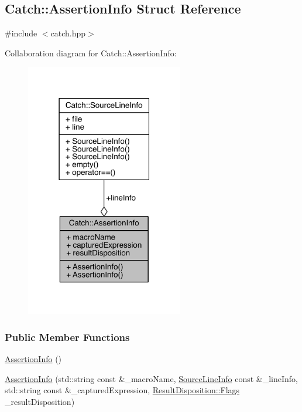 \hypertarget{a00004}{}\subsection{Catch\+:\+:Assertion\+Info Struct Reference}
\label{a00004}


{\ttfamily \#include $<$catch.\+hpp$>$}



Collaboration diagram for Catch\+:\+:Assertion\+Info\+:\nopagebreak
\begin{figure}[H]
\begin{center}
\leavevmode
\includegraphics[width=195pt]{a00170}
\end{center}
\end{figure}
\subsubsection*{Public Member Functions}
\begin{DoxyCompactItemize}
\item 
\hyperlink{a00004_a15c29d306c86361f842a0351a6003b9f}{Assertion\+Info} ()
\item 
\hyperlink{a00004_aaf6cc3eebd40391e54d37ed42953c73f}{Assertion\+Info} (std\+::string const \&\+\_\+macro\+Name, \hyperlink{a00075}{Source\+Line\+Info} const \&\+\_\+line\+Info, std\+::string const \&\+\_\+captured\+Expression, \hyperlink{a00068_a3396cad6e2259af326b3aae93e23e9d8}{Result\+Disposition\+::\+Flags} \+\_\+result\+Disposition)
\end{DoxyCompactItemize}

